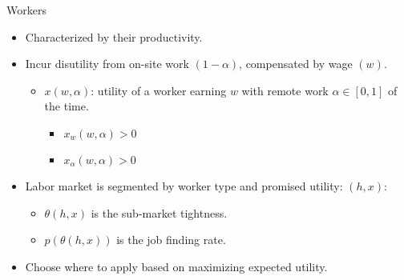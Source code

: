 \documentclass[aspectratio=1610]{beamer}
\begin{document}
\begin{frame}{Workers}
  \begin{itemize}
    \item Characterized by their productivity. \vspace{0.3cm}\pause
    \item Incur disutility from on-site work $(1-\alpha)$, compensated by wage $(w)$.
    \begin{itemize}
        \item $x(w,\alpha)$: utility of a worker earning $w$ with remote work $\alpha\in[0,1]$ of the time.
        \begin{itemize}
            \item $x_{w}(w,\alpha)>0$
            \item $x_{\alpha}(w,\alpha)>0$
        \end{itemize}
    \end{itemize}\vspace{0.3cm}\pause
    \item Labor market is segmented by worker type and promised utility: $(h,x)$:
    \begin{itemize}
        \item $\theta(h,x)$ is the sub-market tightness.
        \item $p(\theta(h,x))$ is the job finding rate.
    \end{itemize}\vspace{0.3cm}\pause
    \item Choose where to apply based on maximizing expected utility.
  \end{itemize}
\end{frame}
\end{document}
